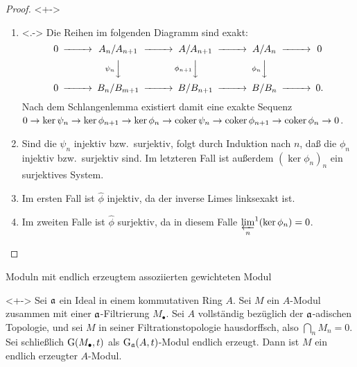 \begin{frame}
	\begin{proof}<+->
		\begin{enumerate}[<+->]
		\item<.->
			Die Reihen im folgenden Diagramm sind exakt:
			\[
				\begin{CD}
					0 @>>> A_n/A_{n + 1} @>>> A/A_{n + 1} @>>> A/A_n @>>> 0 \\
					& & @V{\psi_n}VV @V{\phi_{n + 1}}VV @V{\phi_n}VV \\
					0 @>>> B_n/B_{m + 1} @>>> B/B_{n + 1} @>>> B/B_n @>>> 0.
				\end{CD}
			\]
			Nach dem Schlangenlemma existiert damit eine exakte Sequenz
			\(0 \to \ker \psi_n \to \ker \phi_{n + 1} \to \ker \phi_n \to \operatorname{coker} \psi_n \to \operatorname{coker} \phi_{n + 1} \to \operatorname{coker} \phi_n \to 0	
			\).
		\item
			Sind die \(\psi_n\) injektiv bzw.\ surjektiv, folgt durch Induktion nach \(n\), daß die \(\phi_n\) injektiv bzw.\ surjektiv
			sind. Im letzteren Fall ist außerdem \((\ker \phi_n)_n\) ein surjektives System.
		\item
			Im ersten Fall ist \(\hat \phi\) injektiv, da der inverse Limes linksexakt ist.
		\item
			Im zweiten Falle ist \(\hat \phi\) surjektiv, da in diesem Falle \({\varprojlim\limits_n}^1 (\ker \phi_n) = 0\).
			\qedhere
		\end{enumerate}
	\end{proof}
\end{frame}

\begin{frame}{Moduln mit endlich erzeugtem assoziierten gewichteten Modul}
	\begin{proposition}<+->
		\label{prop:weighted_mod_is_ft}
		Sei \(\mathfrak{a}\) ein Ideal in einem kommutativen Ring \(A\). Sei \(M\) ein \(A\)-Modul zusammen mit
		einer \(\mathfrak{a}\)-Filtrierung \(M_\bullet\). Sei \(A\) vollständig bezüglich der \(\mathfrak{a}\)-adischen Topologie,
		und sei \(M\) in seiner Filtrationstopologie hausdorffsch, also \(\bigcap\limits_n M_n = 0\). Sei schließlich
		\(\operatorname{G}(M_\bullet, t)\) als \(\operatorname{G}_{\mathfrak{a}}(A, t)\)-Modul endlich erzeugt. Dann ist \(M\) ein endlich
		erzeugter \(A\)-Modul.
	\end{proposition}
\end{frame}


